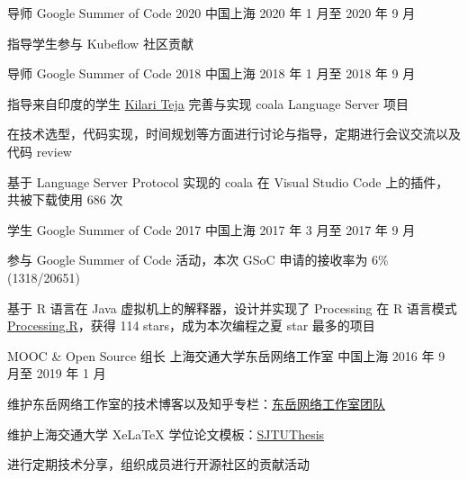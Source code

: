 

\begin{cventries}

  \cventry
    {导师} %
    {Google Summer of Code 2020} %
    {中国上海} %
    {2020 年 1 月至 2020 年 9 月} %
    {
      \begin{cvitems}
        \item 指导学生参与 Kubeflow 社区贡献
      \end{cvitems}
    }

  \cventry
    {导师} %
    {Google Summer of Code 2018} %
    {中国上海} %
    {2018 年 1 月至 2018 年 9 月} %
    {
      \begin{cvitems}
        \item 指导来自印度的学生 \href{https://github.com/ksdme}{Kilari Teja} 完善与实现 coala Language Server 项目
        \item 在技术选型，代码实现，时间规划等方面进行讨论与指导，定期进行会议交流以及代码 review
        \item 基于 Language Server Protocol 实现的 coala 在 Visual Studio Code 上的插件，共被下载使用 686 次
      \end{cvitems}
    }

  \cventry
    {学生} %
    {Google Summer of Code 2017} %
    {中国上海} %
    {2017 年 3 月至 2017 年 9 月} %
    {
      \begin{cvitems} %
        \item 参与 Google Summer of Code 活动，本次 GSoC 申请的接收率为 6\%(1318/20651)
        \item 基于 R 语言在 Java 虚拟机上的解释器，设计并实现了 Processing 在 R 语言模式 \href{https://github.com/gaocegege/Processing.R}{Processing.R}，获得 114 stars，成为本次编程之夏 star 最多的项目
      \end{cvitems}
    }

  \cventry
    {MOOC \& Open Source 组长} %
    {上海交通大学东岳网络工作室} %
    {中国上海} %
    {2016 年 9 月至 2019 年 1 月} %
    {
      \begin{cvitems}
        \item 维护东岳网络工作室的技术博客以及知乎专栏：\href{https://zhuanlan.zhihu.com/dongyue}{东岳网络工作室团队}
        \item 维护上海交通大学 XeLaTeX 学位论文模板：\href{htts://github.com/sjtug/sjtuthesis}{SJTUThesis}
        \item 进行定期技术分享，组织成员进行开源社区的贡献活动
      \end{cvitems}
    }

\end{cventries}
